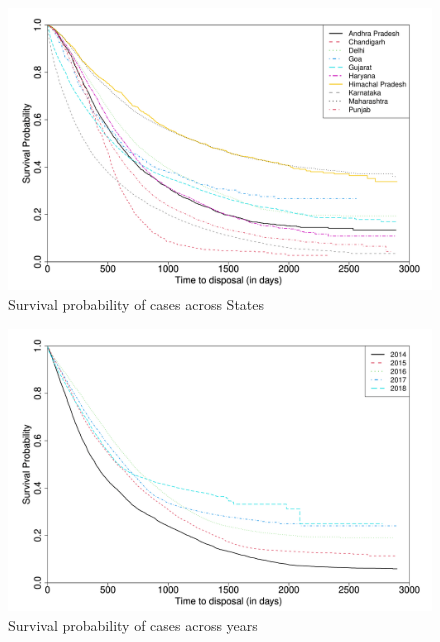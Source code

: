 \begin{figure}
 \centering
 \caption{Survival probability of cases across States}
 \includegraphics[width = \textwidth]{surv_states-1.png}
\end{figure}

\begin{figure}
 \centering
 \caption{Survival probability of cases across years}
 \includegraphics[width = \textwidth]{surv_years-1.png}
\end{figure}

